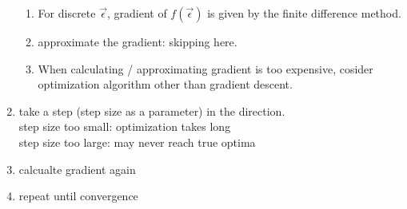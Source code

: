 \documentclass[12pt]{article}
\begin{document}
\begin{enumerate}
\begin{enumerate}
            \item For discrete $\vec{\epsilon}$, gradient of $f(\vec{\epsilon})$ is given by the finite difference method.
            \item approximate the gradient: skipping here.
            \item When calculating / approximating gradient is too expensive, cosider optimization algorithm other than gradient descent.
        \end{enumerate}
    \item take a step (step size as a parameter) in the direction. \\
        step size too small: optimization takes long\\
        step size too large: may never reach true optima
    \item calcualte gradient again
    \item repeat until convergence
\end{enumerate}


\end{document}
